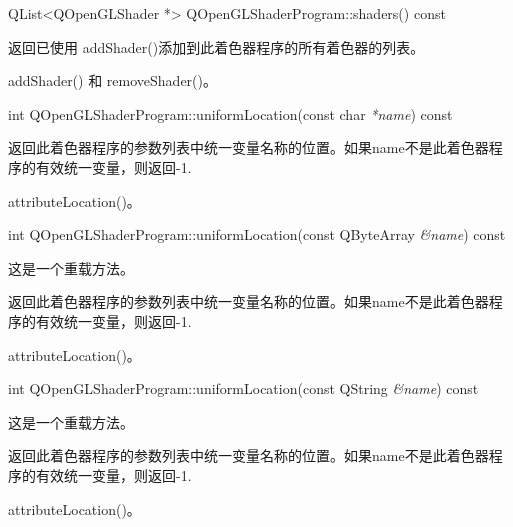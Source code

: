 QList<QOpenGLShader *> QOpenGLShaderProgram::shaders() const

返回已使用 addShader()添加到此着色器程序的所有着色器的列表。

\begin{seeAlso}
addShader() 和 removeShader()。
\end{seeAlso}

int QOpenGLShaderProgram::uniformLocation(const char \emph{*name}) const

返回此着色器程序的参数列表中统一变量名称的位置。如果name不是此着色器程序的有效统一变量，则返回-1.

\begin{seeAlso}
attributeLocation()。
\end{seeAlso}

int QOpenGLShaderProgram::uniformLocation(const QByteArray \emph{\&name}) const

这是一个重载方法。

返回此着色器程序的参数列表中统一变量名称的位置。如果name不是此着色器程序的有效统一变量，则返回-1.

\begin{seeAlso}
attributeLocation()。
\end{seeAlso}

int QOpenGLShaderProgram::uniformLocation(const QString \emph{\&name}) const

这是一个重载方法。

返回此着色器程序的参数列表中统一变量名称的位置。如果name不是此着色器程序的有效统一变量，则返回-1.

\begin{seeAlso}
attributeLocation()。
\end{seeAlso}